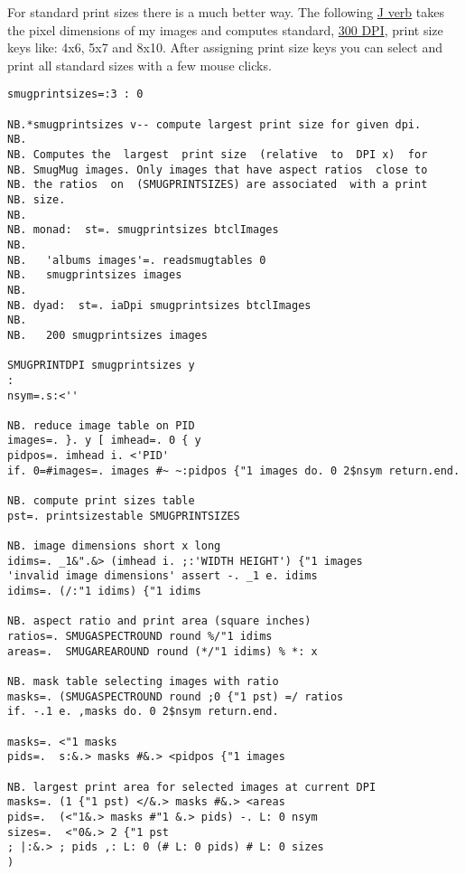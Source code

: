 For standard print sizes there is a much better way. The following
\href{http://www.jsoftware.com/}{J verb} takes the pixel dimensions of
my images and computes standard,
\href{http://www.rideau-info.com/photos/mythdpi.html}{300 DPI}, print
size keys like: 4x6, 5x7 and 8x10. After assigning print size keys you
can select and print all standard sizes with a few mouse clicks.

\begin{tcolorbox}[breakable, size=fbox, boxrule=1pt, pad at break*=1mm,colback=cellbackground, colframe=cellborder]
\begin{lstlisting}[language=jdoc, frame=single,framerule=0pt,label=lst:scr442X0]
smugprintsizes=:3 : 0

NB.*smugprintsizes v-- compute largest print size for given dpi.
NB.
NB. Computes the  largest  print size  (relative  to  DPI x)  for
NB. SmugMug images. Only images that have aspect ratios  close to
NB. the ratios  on  (SMUGPRINTSIZES) are associated  with a print
NB. size.
NB.
NB. monad:  st=. smugprintsizes btclImages
NB.
NB.   'albums images'=. readsmugtables 0
NB.   smugprintsizes images
NB.
NB. dyad:  st=. iaDpi smugprintsizes btclImages
NB.
NB.   200 smugprintsizes images

SMUGPRINTDPI smugprintsizes y
:
nsym=.s:<''

NB. reduce image table on PID
images=. }. y [ imhead=. 0 { y
pidpos=. imhead i. <'PID'
if. 0=#images=. images #~ ~:pidpos {"1 images do. 0 2$nsym return.end.

NB. compute print sizes table
pst=. printsizestable SMUGPRINTSIZES

NB. image dimensions short x long
idims=. _1&".&> (imhead i. ;:'WIDTH HEIGHT') {"1 images
'invalid image dimensions' assert -. _1 e. idims
idims=. (/:"1 idims) {"1 idims

NB. aspect ratio and print area (square inches)
ratios=. SMUGASPECTROUND round %/"1 idims
areas=.  SMUGAREAROUND round (*/"1 idims) % *: x

NB. mask table selecting images with ratio
masks=. (SMUGASPECTROUND round ;0 {"1 pst) =/ ratios
if. -.1 e. ,masks do. 0 2$nsym return.end.

masks=. <"1 masks
pids=.  s:&.> masks #&.> <pidpos {"1 images

NB. largest print area for selected images at current DPI
masks=. (1 {"1 pst) </&.> masks #&.> <areas
pids=.  (<"1&.> masks #"1 &.> pids) -. L: 0 nsym
sizes=.  <"0&.> 2 {"1 pst
; |:&.> ; pids ,: L: 0 (# L: 0 pids) # L: 0 sizes
)
\end{lstlisting}
\end{tcolorbox}


%